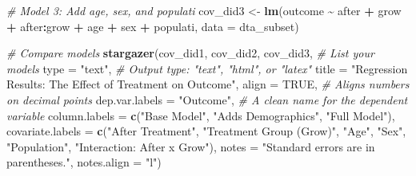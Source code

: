 \documentclass[
]{article}
\newenvironment{Shaded}{\begin{snugshade}}{\end{snugshade}}
\newcommand{\AttributeTok}[1]{\textcolor[rgb]{0.13,0.29,0.53}{#1}}
\newcommand{\CommentTok}[1]{\textcolor[rgb]{0.56,0.35,0.01}{\textit{#1}}}
\newcommand{\ConstantTok}[1]{\textcolor[rgb]{0.56,0.35,0.01}{#1}}
\newcommand{\FunctionTok}[1]{\textcolor[rgb]{0.13,0.29,0.53}{\textbf{#1}}}
\newcommand{\NormalTok}[1]{#1}
\newcommand{\OtherTok}[1]{\textcolor[rgb]{0.56,0.35,0.01}{#1}}
\newcommand{\SpecialCharTok}[1]{\textcolor[rgb]{0.81,0.36,0.00}{\textbf{#1}}}
\newcommand{\StringTok}[1]{\textcolor[rgb]{0.31,0.60,0.02}{#1}}
\begin{document}
\begin{Shaded}
\begin{Highlighting}[]
\CommentTok{\# Model 3: Add age, sex, and populati}
\NormalTok{cov\_did3 }\OtherTok{\textless{}{-}} \FunctionTok{lm}\NormalTok{(outcome }\SpecialCharTok{\textasciitilde{}}\NormalTok{ after }\SpecialCharTok{+}\NormalTok{ grow }\SpecialCharTok{+}\NormalTok{ after}\SpecialCharTok{:}\NormalTok{grow }\SpecialCharTok{+}\NormalTok{ age }\SpecialCharTok{+}\NormalTok{ sex }\SpecialCharTok{+}\NormalTok{ populati, }\AttributeTok{data =}\NormalTok{ dta\_subset)}
\end{Highlighting}
\end{Shaded}

\begin{Shaded}
\begin{Highlighting}[]
\CommentTok{\# Compare models}
\FunctionTok{stargazer}\NormalTok{(cov\_did1, cov\_did2, cov\_did3,      }\CommentTok{\# List your models}
          \AttributeTok{type =} \StringTok{"text"}\NormalTok{,                   }\CommentTok{\# Output type: "text", "html", or "latex"}
          \AttributeTok{title =} \StringTok{"Regression Results: The Effect of Treatment on Outcome"}\NormalTok{,}
          \AttributeTok{align =} \ConstantTok{TRUE}\NormalTok{,                    }\CommentTok{\# Aligns numbers on decimal points}
          \AttributeTok{dep.var.labels =} \StringTok{"Outcome"}\NormalTok{,      }\CommentTok{\# A clean name for the dependent variable}
          \AttributeTok{column.labels =} \FunctionTok{c}\NormalTok{(}\StringTok{"Base Model"}\NormalTok{, }\StringTok{"Adds Demographics"}\NormalTok{, }\StringTok{"Full Model"}\NormalTok{),}
          \AttributeTok{covariate.labels =} \FunctionTok{c}\NormalTok{(}\StringTok{"After Treatment"}\NormalTok{, }\StringTok{"Treatment Group (Grow)"}\NormalTok{, }\StringTok{"Age"}\NormalTok{,}
                               \StringTok{"Sex"}\NormalTok{, }\StringTok{"Population"}\NormalTok{, }\StringTok{"Interaction: After x Grow"}\NormalTok{),}
          \AttributeTok{notes =} \StringTok{"Standard errors are in parentheses."}\NormalTok{,}
          \AttributeTok{notes.align =} \StringTok{"l"}\NormalTok{)}
\end{Highlighting}
\end{Shaded}
\end{document}
